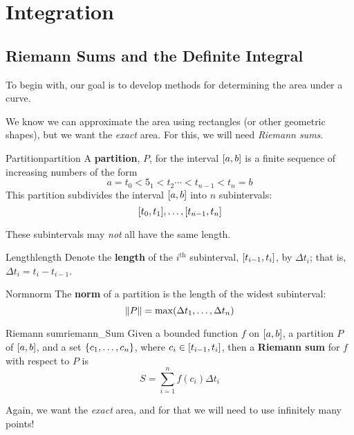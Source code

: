 \chapter{Integration}
\setcounter{section}{1}
\section{Riemann Sums and the Definite Integral}
To begin with, our goal is to develop methods for determining the area under a curve.

We know we can approximate the area using rectangles (or other geometric shapes), but
we want the \emph{exact} area. For this, we will need \emph{Riemann sums}.

\begin{Definition}{Partition}{partition}
    A \textbf{partition}, $P$, for the interval $ \interval{a}{b} $ is a finite
    sequence of increasing numbers of the form
    \[ a=t_0<5_1<t_2\cdots<t_{n-1}<t_n=b \]
    This partition subdivides the interval $ \interval{a}{b} $ into $ n $ subintervals:
    \[ \interval{t_0}{t_1},\ldots,\interval{t_{n-1}}{t_n} \]
\end{Definition}

\begin{Remark}{}{}
    These subintervals may \emph{not} all have the same length.
\end{Remark}

\begin{Definition}{Length}{length}
    Denote the \textbf{length} of the $ i^{\text{th}} $ subinterval,
    $ \interval{t_{i-1}}{t_i} $, by $ \Delta t_i $; that is, $ \Delta t_i=t_i-t_{i-1} $.
\end{Definition}

\begin{Definition}{Norm}{norm}
    The \textbf{norm} of a partition is the length of the widest subinterval:
    \[ \lVert P\rVert=\max(\Delta t_1,\dots,\Delta t_{n}) \]
\end{Definition}

\begin{Definition}{Riemann sum}{riemann_Sum}
    Given a bounded function $ f $ on $ \interval{a}{b} $,
    a partition $ P $ of $ \interval{a}{b} $, and a set
    $ \{c_1,\dots,c_n\} $, where $ c_i\in\interval{t_{i-1}}{t_i} $, then a
    \textbf{Riemann sum} for $ f $ with respect to $ P $ is
    \[ S=\sum\limits_{i=1}^{n} f(c_i)\Delta t_i \]
\end{Definition}

Again, we want the \emph{exact} area, and for that we will need to use infinitely
many points!

